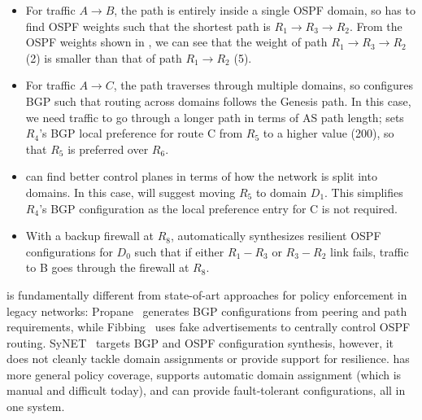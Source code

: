 \begin{itemize}
	\item
For traffic $A \rightarrow B$, the path is entirely inside
a single OSPF domain, so \name has to find OSPF weights 
such that the shortest path is $R_1 \rightarrow R_3 \rightarrow 
R_2$. From the OSPF weights shown in , 
we can see that the weight of path $R_1 
\rightarrow R_3 \rightarrow R_2$ (2) is smaller than that of path
$R_1 \rightarrow R_2$ (5). 
 	\item For traffic $A \rightarrow C$, the path traverses through 
 	multiple domains, so \name configures BGP such that 
 	routing across domains follows the Genesis path. In this case, 
 	we need traffic to go through a longer path in terms of AS path
 	length; \name sets $R_4$'s BGP local preference for route C
 	from $R_5$ to a higher value (200), so that $R_5$ is 
 	preferred over $R_6$. 
 	\item \name can find better control planes in terms of how 
 	the network is split into domains. In this case,  
 	\name will suggest moving $R_5$ to domain $D_1$. 
 	This simplifies $R_4$'s BGP configuration as the local preference 
 	entry for C is not required. 
 	\item With a backup firewall at $R_8$, 
 	\name automatically synthesizes resilient OSPF configurations
          for $D_0$ such that if either $R_1-R_3$ or $R_3-R_2$ link
          fails, traffic to B goes through the firewall at $R_8$.
\end{itemize}
\name is fundamentally different from state-of-art approaches for policy enforcement
in legacy networks: Propane~\cite{propane} generates BGP configurations
from peering and path requirements, while Fibbing~\cite{fibbing} uses fake
advertisements to centrally control OSPF routing. SyNET~\cite{synet} targets
BGP and OSPF configuration synthesis, however, it does not cleanly
tackle domain assignments or provide support for resilience. 
\name has more general policy coverage, supports automatic domain assignment 
(which is manual and difficult today), and can provide fault-tolerant configurations, all in one system.
